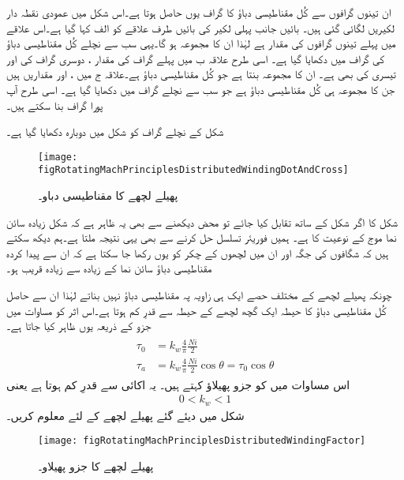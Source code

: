 ان تینوں گرافوں سے کُل مقناطیسی دباؤ کا گراف یوں حاصل ہوتا ہے۔اس شکل میں عمودی نقطہ دار لکیریں لگائی گئی ہیں۔ بائیں جانب پہلی لکیر کی بائیں طرف علاقے کو الف کہا گیا ہے۔اس علاقے میں پہلے تینوں گرافوں کی مقدار  ہے لہٰذا ان کا مجموعہ  ہو گا۔یہی سب سے نچلے کُل مقناطیسی دباؤ کی گراف میں دکھایا گیا ہے۔ اسی طرح علاقہ ب میں پہلے گراف کی مقدار  ، دوسری گراف کی  اور تیسری کی بھی  ہے۔ ان کا مجموعہ  بنتا ہے جو کُل مقناطیسی دباؤ ہے۔علاقہ ج میں
 ،  اور  مقداریں ہیں جن کا مجموعہ  ہی کُل مقناطیسی دباؤ ہے جو سب سے نچلے گراف میں دکھایا گیا ہے۔ اسی طرح آپ پورا گراف بنا سکتے ہیں۔

شکل   کے نچلے گراف کو شکل   میں دوبارہ دکھایا گیا ہے۔
\begin{figure}
\centering
\texttt{[image: figRotatingMachPrinciplesDistributedWindingDotAndCross]}
\caption{پھیلے لچھے کا مقناطیسی دباو۔}
\label{شکل_گھومتے_مشین_پھیلے_لچھے_نقطہ_صلیب_پر_جمپ}
\end{figure}

شکل   کا اگر شکل   کے ساتھ تقابل کیا جائے تو محض دیکھنے سے بھی یہ
 ظاہر ہے کہ شکل    زیادہ سائن نما موج کے نوعیت کا ہے۔ ہمیں فوریئر تسلسل حل کرنے سے بھی یہی نتیجہ ملتا ہے۔ہم دیکھ سکتے ہیں کہ  شگافوں کی جگہ اور ان میں لچھوں کے چکر کو یوں رکھا جا سکتا ہے کہ ان سے پیدا کردہ مقناطیسی دباؤ سائن نما کے زیادہ سے زیادہ قریب ہو۔

چونکہ پھیلے لچھے کے مختلف حصے ایک ہی زاویہ پہ مقناطیسی دباؤ نہیں بناتے لہٰذا ان سے حاصل کُل مقناطیسی دباؤ کا حیطہ ایک گچھ لچھے  کے حیطہ سے قدرِ کم ہوتا ہے۔اس اثر کو مساوات میں جزو  کے ذریعہ یوں ظاہر کیا جاتا ہے۔
\begin{gather}
\begin{aligned}
\tau_0&=k_w \frac{4}{\pi}\frac{N i}{2}\\
\tau_{a}&=k_w \frac{4}{\pi}\frac{N i}{2} \cos \theta=\tau_0 \cos \theta
\end{aligned}
\end{gather}
اس مساوات میں  کو جزو  پھیلاؤ  کہتے ہیں۔ یہ  اکائی سے قدرِ کم ہوتا ہے یعنی
\begin{align}
0<k_w<1
\end{align}
%
شکل   میں دیئے گئے پھیلے لچھے کے لئے  معلوم کریں۔
\begin{figure}
\centering
\texttt{[image: figRotatingMachPrinciplesDistributedWindingFactor]}
\caption{پھیلے لچھے کا جزو پھیلاو۔}
\label{شکل_گھومتے_مشین_جزو_پھیلاو}
\end{figure}

